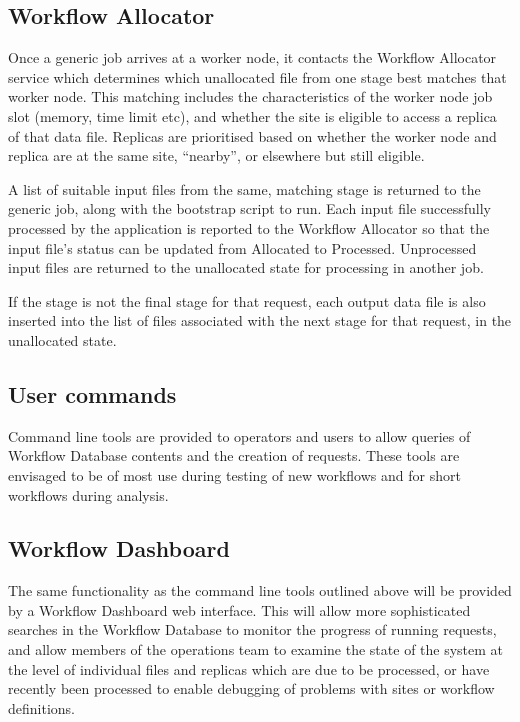 \documentclass[../main-v1.tex]{subfiles}
\begin{document}
\subsection{Workflow Allocator}
\label{sec:flow:allocator}

Once a generic job arrives at a worker node, it contacts the Workflow Allocator service which determines which unallocated file from one stage best matches that worker node. This matching includes the characteristics of the worker node job slot (memory, time limit etc), and whether the site is eligible to access a replica of that data file. Replicas are prioritised based on whether the worker node and replica are at the same site, ``nearby'', or elsewhere but still eligible. 

A list of suitable input files from the same, matching stage is returned to the generic job, along with the bootstrap script to run. Each input file successfully processed by the application is reported to the Workflow Allocator so that the input file’s status can be updated from Allocated to Processed. Unprocessed input files are returned to the unallocated state for processing in another job. 

If the stage is not the final stage for that request, each output data file is also inserted into the list of files associated with the next stage for that request, in the unallocated state. 

\subsection{User commands }
\label{sec:flow:commands}

Command line tools are provided to operators and users to allow queries of Workflow Database contents and the creation of requests. These tools are envisaged to be of most use during testing of new workflows and for short workflows during analysis. 

\subsection{Workflow Dashboard}
\label{sec:flow:dashboard}

The same functionality as the command line tools outlined above will be provided by a Workflow Dashboard web interface. This will allow more sophisticated searches in the Workflow Database to monitor the progress of running requests, and allow members of the operations team to examine the state of the system at the level of individual files and replicas which are due to be processed, or have recently been processed to enable debugging of problems with sites or workflow definitions.
\end{document}
